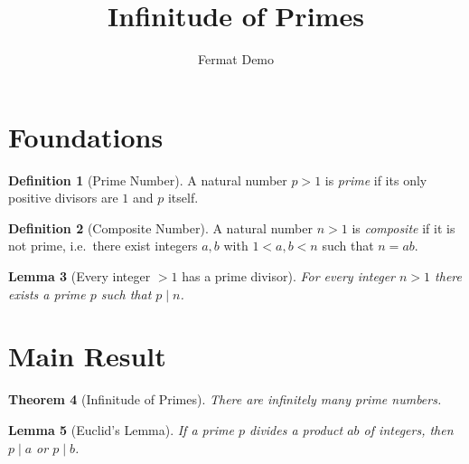 \documentclass{article}
\title{Infinitude of Primes}
\author{Fermat Demo}
\date{}
\newtheorem{theorem}{Theorem}[section]
\newtheorem{lemma}[theorem]{Lemma}
\theoremstyle{definition}
\newtheorem{definition}[theorem]{Definition}
\begin{document}
\maketitle


\section{Foundations}

\begin{definition}[Prime Number]
\label{def:prime}
A natural number $p > 1$ is \emph{prime} if its only positive divisors are
$1$ and $p$ itself.
\end{definition}

\begin{definition}[Composite Number]
\label{def:composite}
A natural number $n > 1$ is \emph{composite} if it is not prime, i.e.\ there
exist integers $a, b$ with $1 < a, b < n$ such that $n = ab$.
\end{definition}

\begin{lemma}[Every integer $> 1$ has a prime divisor]
\label{lem:prime-divisor}
For every integer $n > 1$ there exists a prime $p$ such that $p \mid n$.
\end{lemma}

\section{Main Result}

\begin{theorem}[Infinitude of Primes]
\label{thm:inf-primes}
There are infinitely many prime numbers.
\end{theorem}

\begin{lemma}[Euclid's Lemma]
\label{lem:euclid}
If a prime $p$ divides a product $ab$ of integers, then $p \mid a$ or $p \mid b$.
\end{lemma}
\end{document}
